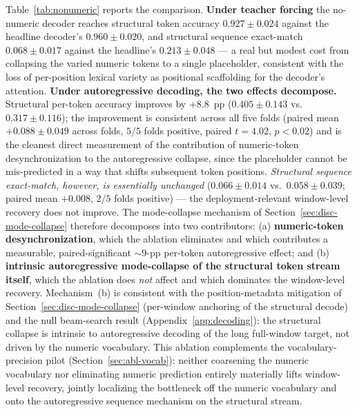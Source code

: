 Table~\ref{tab:nonumeric} reports the comparison. \textbf{Under teacher
forcing} the no-numeric decoder reaches structural token accuracy
$0.927 \pm 0.024$ against the headline decoder's $0.960 \pm 0.020$, and
structural sequence exact-match $0.068 \pm 0.017$ against the headline's
$0.213 \pm 0.048$ --- a real but modest cost from collapsing the varied
numeric tokens to a single placeholder, consistent with the loss of
per-position lexical variety as positional scaffolding for the decoder's
attention. \textbf{Under autoregressive decoding, the two effects decompose.}
Structural per-token accuracy improves by $+8.8$~pp ($0.405 \pm 0.143$ vs.\
$0.317 \pm 0.116$); the improvement is consistent across all five folds
(paired mean $+0.088 \pm 0.049$ across folds, $5/5$ folds positive,
paired $t=4.02$, $p\!<\!0.02$) and is the cleanest direct measurement of the
contribution of numeric-token desynchronization to the autoregressive
collapse, since the placeholder cannot be mis-predicted in a way that shifts
subsequent token positions. \emph{Structural sequence exact-match, however,
is essentially unchanged} ($0.066 \pm 0.014$ vs.\ $0.058 \pm 0.039$; paired
mean $+0.008$, $2/5$ folds positive) --- the deployment-relevant window-level
recovery does not improve. The mode-collapse mechanism of
Section~\ref{sec:disc-mode-collapse} therefore decomposes into two
contributors: (a) \textbf{numeric-token desynchronization}, which the ablation
eliminates and which contributes a measurable, paired-significant
$\sim$$9$-pp per-token autoregressive effect; and (b) \textbf{intrinsic
autoregressive mode-collapse of the structural token stream itself}, which the
ablation does \emph{not} affect and which dominates the window-level
recovery. Mechanism~(b) is consistent with the position-metadata mitigation
of Section~\ref{sec:disc-mode-collapse} (per-window anchoring of the structural
decode) and the null beam-search result (Appendix~\ref{app:decoding}): the
structural collapse is intrinsic to autoregressive decoding of the long
full-window target, not driven by the numeric vocabulary. This ablation
complements the vocabulary-precision pilot (Section~\ref{sec:abl-vocab}):
neither coarsening the numeric vocabulary nor eliminating numeric prediction
entirely materially lifts window-level recovery, jointly localizing the
bottleneck off the numeric vocabulary and onto the autoregressive sequence
mechanism on the structural stream.

